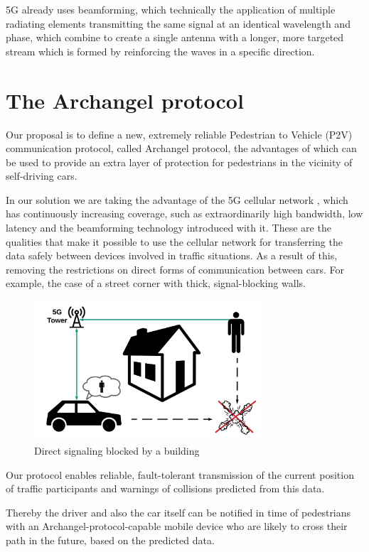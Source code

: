 \documentclass[conference]{IEEEtran}
\begin{document}
5G already uses beamforming, which technically the application of multiple radiating elements transmitting the same signal at an identical wavelength and phase, which combine to create a single antenna with a longer, more targeted stream which is formed by reinforcing the waves in a specific direction. \cite{b3}

\section{The Archangel protocol}
Our proposal is to define a new, extremely reliable Pedestrian to Vehicle (P2V) communication protocol, called Archangel protocol, the advantages of which can be used to provide an extra layer of protection for pedestrians in the vicinity of self-driving cars.

In our solution we are taking the advantage of the 5G cellular network \cite{b4,b5}, which has continuously increasing coverage, such as extraordinarily high bandwidth, low latency and the beamforming technology introduced with it. These are the qualities that make it possible to use the cellular network for transferring the data safely between devices involved in traffic situations. As a result of this, removing the restrictions on direct forms of communication between cars. For example, the case of a street corner with thick, signal-blocking walls.

\begin{figure}[ht]
    \centering
    \includegraphics[width=8.5cm]{./pics/Corner.png}
    \caption{Direct signaling blocked by a building}
\end{figure}

Our protocol enables reliable, fault-tolerant transmission of the current position of traffic participants and warnings of collisions predicted from this data.

Thereby the driver and also the car itself can be notified in time of pedestrians with an Archangel-protocol-capable mobile device who are likely to cross their path in the future, based on the predicted data.
\end{document}

